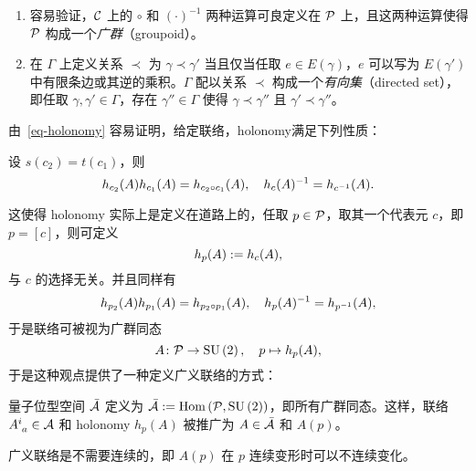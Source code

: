 
			\begin{Remark}
				\begin{enumerate}
					\item 容易验证，$\mathcal{C}$ 上的 $\circ$ 和 $(\cdot)^{-1}$ 两种运算可良定义在 $\mathcal{P}$ 上，且这两种运算使得 $\mathcal{P}$ 构成一个\emph{广群}（groupoid）。
					\item 在 $\Gamma$ 上定义关系 $\prec$ 为 $\gamma \prec \gamma'$ 当且仅当任取 $e\in E(\gamma)$，$e$ 可以写为 $E(\gamma')$ 中有限条边或其逆的乘积。$\Gamma$ 配以关系 $\prec$ 构成一个\emph{有向集}（directed set），即任取 $\gamma,\gamma' \in \Gamma$，存在 $\gamma'' \in \Gamma$ 使得 $\gamma \prec \gamma''$ 且 $\gamma' \prec \gamma''$。
				\end{enumerate}
			\end{Remark}

			由~\eqref{eq-holonomy} 容易证明，给定联络，holonomy满足下列性质：
			\begin{Property}
				设 $s(c_2) = t(c_1)$，则
				\begin{equation}
					h_{c_2}(A) h_{c_1}(A) = h_{c_2 \circ c_1}(A) \qc h_{c}(A)^{-1} = h_{c^{-1}}(A).
				\end{equation}
			\end{Property}
			这使得 holonomy 实际上是定义在道路上的，任取 $p\in \mathcal{P}$，取其一个代表元 $c$，即 $p=[c]$，则可定义
			\begin{equation}
				h_p(A) := h_c(A),
			\end{equation}
			与 $c$ 的选择无关。并且同样有
			\begin{equation}
				h_{p_2}(A) h_{p_1}(A) = h_{p_2 \circ p_1}(A) \qc h_{p}(A)^{-1} = h_{p^{-1}}(A),
			\end{equation}
			于是联络可被视为广群同态
			\begin{equation}
				A \colon \setofpath \rightarrow \SU{2} \qc p \mapsto h_p(A),
			\end{equation}
			于是这种观点提供了一种定义广义联络的方式：
			\begin{Definition}[量子位型空间]
				量子位型空间 $\bar{\mathcal{A}}$ 定义为 $\bar{\mathcal{A}} := \mathrm{Hom}\left( \mathcal{P},\mathrm{SU}\left(2\right) \right)$，即所有广群同态。这样，联络 $\tensor{A}{^i_a} \in \configurationspace{A}$ 和 holonomy $h_p(A)$ 被推广为 $A \in \bar{\mathcal{A}}$ 和 $A(p)$。
			\end{Definition}
			广义联络是不需要连续的，即 $A(p)$ 在 $p$ 连续变形时可以不连续变化。

